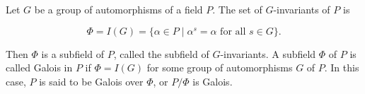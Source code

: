 Let $G$ be a group of automorphisms of a field $P$. The set of $G$-invariants of $P$ is

$$\Phi = I(G) = \{\alpha \in P \mid \alpha^s = \alpha \text{ for all } s \in G\}.$$

Then $\Phi$ is a subfield of $P$, called the subfield of $G$-invariants. A subfield $\Phi$ of $P$ is called Galois in $P$ if $\Phi = I(G)$ for some group of automorphisms $G$ of $P$. In this case, $P$ is said to be Galois over $\Phi$, or $P/\Phi$ is Galois.
